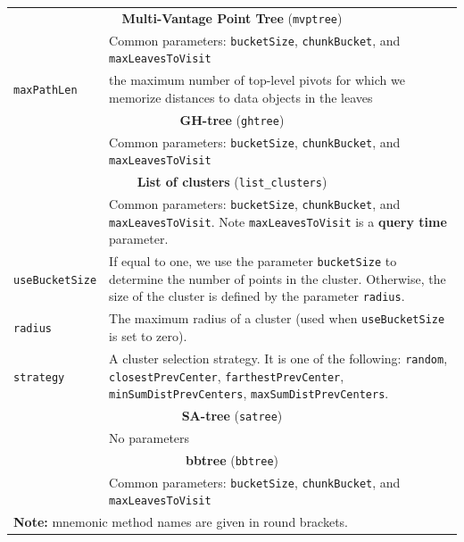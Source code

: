 \documentclass[runningheads,a4paper]{llncs}
\newcommand{\ttt}[1]{\texttt{#1}}
\begin{document}
{\begin{table}
\begin{tabular}{l@{\hspace{2mm}}p{3.5in}}
\cmidrule(l){1-2} 
\multicolumn{2}{c}{\textbf{Multi-Vantage Point Tree} (\ttt{mvptree})  \cite{bozkaya1999indexing}}   \\
\cmidrule(l){1-2} 
                   & Common parameters: \ttt{bucketSize}, \ttt{chunkBucket}, and \ttt{maxLeavesToVisit} \\
 \ttt{maxPathLen}  & the maximum number of top-level pivots for which we memorize distances
to data objects in the leaves \\
\cmidrule(l){1-2} 
\multicolumn{2}{c}{\textbf{GH-tree} (\ttt{ghtree})  \cite{Uhlmann:1991}}   \\
\cmidrule(l){1-2} 
                   & Common parameters: \ttt{bucketSize}, \ttt{chunkBucket}, and \ttt{maxLeavesToVisit} \\
\cmidrule(l){1-2} 
\multicolumn{2}{c}{\textbf{List of clusters} (\ttt{list\_clusters})  \cite{chavez2005compact}}   \\
\cmidrule(l){1-2} 
                   & Common parameters: \ttt{bucketSize}, \ttt{chunkBucket}, and \ttt{maxLeavesToVisit}. Note \ttt{maxLeavesToVisit} is a \textbf{query time} parameter. \\
\ttt{useBucketSize} & If equal to one, we use the parameter \ttt{bucketSize} to determine the number of points in the cluster. Otherwise, the size of the cluster is defined by the parameter \ttt{radius}. \\
\ttt{radius}        & The maximum radius of a cluster (used when \ttt{useBucketSize} is set to zero). \\
\ttt{strategy}      & A cluster selection strategy. It is one of the following: \ttt{random}, \ttt{closestPrevCenter}, \ttt{farthestPrevCenter}, \ttt{minSumDistPrevCenters}, \ttt{maxSumDistPrevCenters}. \\ 
\cmidrule(l){1-2} 
\multicolumn{2}{c}{\textbf{SA-tree} (\ttt{satree})  \cite{navarro2002searching}}   \\
\cmidrule(l){1-2} 
                   & No parameters \\
\cmidrule(l){1-2} 
\multicolumn{2}{c}{\textbf{bbtree} (\ttt{bbtree})  \cite{Cayton2008}}   \\
\cmidrule(l){1-2} 
                   & Common parameters: \ttt{bucketSize}, \ttt{chunkBucket}, and \ttt{maxLeavesToVisit} \\
\bottomrule
\multicolumn{2}{l}{\textbf{Note:} mnemonic method names are given in round brackets.}
\end{tabular}
\vspace{2em}
\end{table}

}
\end{document}
